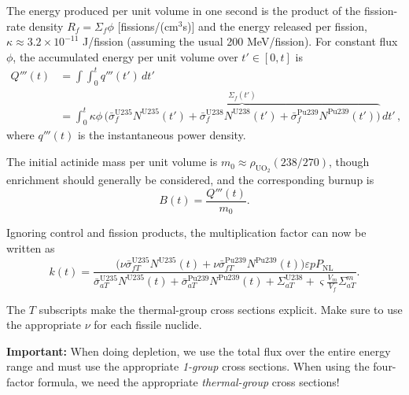 \documentclass[compact]{ne630handout}
\begin{document}
\newpage

\colstart

The energy produced per unit volume in one second is the product of the
fission-rate density $R_f=\Sigma_f\phi$ [fissions/(cm$^3$s)] and the energy
released per fission, $\kappa\approx3.2\times10^{-11}$ J/fission
(assuming the usual 200 MeV/fission). For constant flux $\phi$, the
accumulated energy per unit volume over $t'\in[0,t]$ is
\begin{align*}
 Q'''(t) &= \int\int_0^t q'''(t')\,dt' \\
         &=\int_0^t\kappa\phi\,
 \overbrace{\Big(\bar\sigma_f^{\mathrm{U}235}N^{\mathrm{U}235}(t')
 +\bar\sigma_f^{\mathrm{U}238}N^{\mathrm{U}238}(t')
 +\bar\sigma_f^{\mathrm{Pu}239}N^{\mathrm{Pu}239}(t')\Big)}^{\Sigma_f(t')}\,dt' \, ,
\end{align*}
where $q'''(t)$ is the instantaneous power density.

\vspace{5pt}

The initial actinide mass per unit volume is
$m_0 \approx\rho_{\mathrm{UO_2}}(238/270)$, though enrichment should generally
be considered, and the corresponding burnup is
\[
 B(t)=\frac{Q'''(t)}{m_0}.
\]


Ignoring control and fission products, the multiplication factor can now be written as
\begin{equation*}
 k(t)=\frac{\big(\nu\bar\sigma_{fT}^{\mathrm{U}235}N^{\mathrm{U}235}(t)
       +\nu\bar\sigma_{fT}^{\mathrm{Pu}239}N^{\mathrm{Pu}239}(t)\big)
       \varepsilon pP_{\mathrm{NL}}}
 {\bar\sigma_{aT}^{\mathrm{U}235}N^{\mathrm{U}235}(t)
  +\bar\sigma_{aT}^{\mathrm{Pu}239}N^{\mathrm{Pu}239}(t)
  +\Sigma_{aT}^{\mathrm{U}238}+\varsigma\frac{V_m}{V_f}\Sigma_{aT}^{m}}.
 \tag{FNRP 10.39*}
\end{equation*}

The $T$ subscripts make the thermal-group cross sections explicit.
Make sure to use the appropriate $\nu$ for each fissile nuclide.

\vspace{5pt}

\textbf{Important:} When doing depletion, we use the total flux over the
entire energy range and must use the appropriate \emph{1-group} cross sections.
When using the four-factor formula, we need the appropriate
\emph{thermal-group} cross sections!
\end{document}

